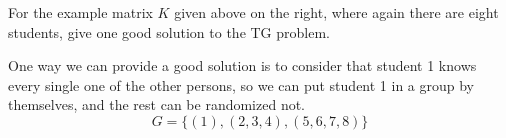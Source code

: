 \documentclass[11pt,fleqn]{exam}
\newcommand{\fillinMCmath}[1]{\begin{tikzpicture}\draw circle [radius=0.5em];\end{tikzpicture}\ #1}
\newif\ifsolutions\solutionsfalse
\newenvironment{soln}{\color{solnblue}}{}
\begin{document}
\begin{questions}
\question[2]
  For the example matrix $K$ given above on the right, where again there are eight students, give one good solution to the TG problem.

\begin{soln}
	One way we can provide a good solution is to consider that student 1 knows every single one 
	of the other persons, so we can put student 1 in a group by themselves, and the rest can be randomized not.
	\[ G = \{(1), (2, 3, 4), (5, 6, 7, 8)\} \]
\end{soln}

      \ifsolutions
      
      \fi
	
  

%     
    

%     
    

%     


%     
    


%     


\end{questions}
\end{document}
